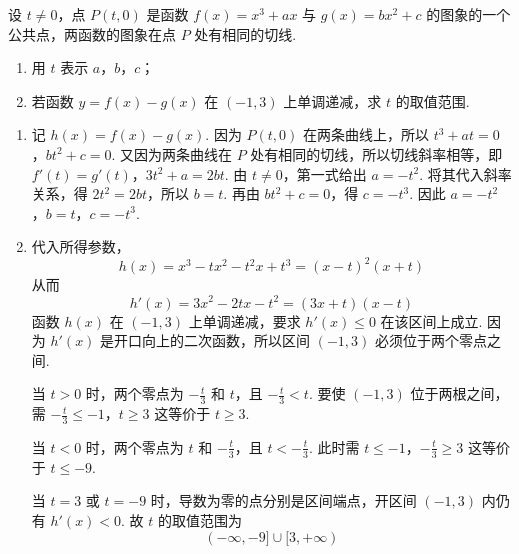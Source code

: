 \begin{problem}
设 \(t \neq 0\)，点 \(P(t,0)\) 是函数 \(f(x) = x^3 + ax\) 与 \(g(x) = bx^2 + c\) 的图象的一个公共点，两函数的图象在点 \(P\) 处有相同的切线.

\begin{enumerate}
\item 用 \(t\) 表示 \(a\)，\(b\)，\(c\)；
\item 若函数 \( y = f(x) - g(x) \) 在 \((-1, 3)\) 上单调递减，求 \( t \) 的取值范围.
\end{enumerate}

\begin{solution}
\begin{enumerate}
\item 记 \(h(x)=f(x)-g(x)\). 因为 \(P(t,0)\) 在两条曲线上，所以
\(t^3+at=0\)，\(bt^2+c=0\).
又因为两条曲线在 \(P\) 处有相同的切线，所以切线斜率相等，即
\(f'(t)=g'(t)\)，\(3t^2+a=2bt\).
由 \(t\neq0\)，第一式给出 \(a=-t^2\). 将其代入斜率关系，得
\(2t^2=2bt\)，所以 \(b=t\). 再由 \(bt^2+c=0\)，得 \(c=-t^3\). 因此
\(a=-t^2\)，\(b=t\)，\(c=-t^3\).

\item 代入所得参数，
\[
h(x)=x^3-tx^2-t^2x+t^3=(x-t)^2(x+t)
\]
从而
\[
h'(x)=3x^2-2tx-t^2=(3x+t)(x-t)
\]
函数 \(h(x)\) 在 \((-1,3)\) 上单调递减，要求 \(h'(x)\leqslant0\) 在该区间上成立. 因为 \(h'(x)\) 是开口向上的二次函数，所以区间 \((-1,3)\) 必须位于两个零点之间.

当 \(t>0\) 时，两个零点为 \(-\frac{t}{3}\) 和 \(t\)，且 \(-\frac{t}{3}<t\). 要使 \((-1,3)\) 位于两根之间，需
\(-\frac{t}{3}\leqslant-1\)，\(t\geqslant3\)
这等价于 \(t\geqslant3\).

当 \(t<0\) 时，两个零点为 \(t\) 和 \(-\frac{t}{3}\)，且 \(t<-\frac{t}{3}\). 此时需
\(t\leqslant-1\)，\(-\frac{t}{3}\geqslant3\)
这等价于 \(t\leqslant-9\).

当 \(t=3\) 或 \(t=-9\) 时，导数为零的点分别是区间端点，开区间 \((-1,3)\) 内仍有 \(h'(x)<0\). 故 \(t\) 的取值范围为
\[
(-\infty,-9]\cup[3,+\infty)
\]
\end{enumerate}
\end{solution}
\end{problem}

